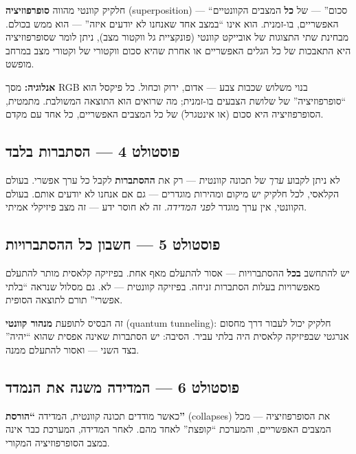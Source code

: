 \documentclass[
  hebrew,
  letterpaper,
  DIV=11,
  numbers=noendperiod]{scrreprt}
\begin{document}
חלקיק קוונטי מהווה \textbf{סופרפוזיציה} (superposition) --- ``סכום'' ---
של \textbf{כל} המצבים הקוונטיים האפשריים, בו-זמנית. הוא אינו ``במצב אחד
שאנחנו לא יודעים איזה'' --- הוא ממש בכולם. מבחינת שתי התצוגות של אובייקט
קוונטי (פונקציית גל ווקטור מצב), ניתן לומר שסופרפוזיציה היא התאבכות של
כל הגלים האפשריים או אחרת שהיא סכום ווקטורי של וקטורי מצב במרחב מופשט.

\textbf{אנלוגיה:} מסך RGB בנוי משלוש שכבות צבע --- אדום, ירוק וכחול. כל
פיקסל הוא ``סופרפוזיציה'' של שלושת הצבעים בו-זמנית; מה שרואים הוא התוצאה
המשולבת. מתמטית, הסופרפוזיציה היא סכום (או אינטגרל) של כל המצבים
האפשריים, כל אחד עם מקדם.

\subsection{פוסטולט 4 --- הסתברות
בלבד}\label{ux5e4ux5d5ux5e1ux5d8ux5d5ux5dcux5d8-4-ux5d4ux5e1ux5eaux5d1ux5e8ux5d5ux5ea-ux5d1ux5dcux5d1ux5d3}

לא ניתן לקבוע \emph{ערך} של תכונה קוונטית --- רק את \textbf{ההסתברות}
לקבל כל ערך אפשרי. בעולם הקלאסי, לכל חלקיק יש מיקום ומהירות מוגדרים ---
גם אם אנחנו לא יודעים אותם. בעולם הקוונטי, אין ערך מוגדר \emph{לפני
המדידה}. זה לא חוסר ידע --- זה מצב פיזיקלי אמיתי.

\subsection{פוסטולט 5 --- חשבון כל
ההסתברויות}\label{ux5e4ux5d5ux5e1ux5d8ux5d5ux5dcux5d8-5-ux5d7ux5e9ux5d1ux5d5ux5df-ux5dbux5dc-ux5d4ux5d4ux5e1ux5eaux5d1ux5e8ux5d5ux5d9ux5d5ux5ea}

יש להתחשב \textbf{בכל} ההסתברויות --- אסור להתעלם מאף אחת. בפיזיקה
קלאסית מותר להתעלם מאפשרויות בעלות הסתברות זניחה. בפיזיקה קוונטית ---
לא. גם מסלול שנראה ``בלתי אפשרי'' תורם לתוצאה הסופית.

זה הבסיס לתופעת \textbf{מנהור קוונטי} (quantum tunneling): חלקיק יכול
לעבור דרך מחסום אנרגטי שבפיזיקה קלאסית היה בלתי עביר. הסיבה: יש הסתברות
שאינה אפסית שהוא ``יהיה'' בצד השני --- ואסור להתעלם ממנה.

\subsection{פוסטולט 6 --- המדידה משנה את
הנמדד}\label{ux5e4ux5d5ux5e1ux5d8ux5d5ux5dcux5d8-6-ux5d4ux5deux5d3ux5d9ux5d3ux5d4-ux5deux5e9ux5e0ux5d4-ux5d0ux5ea-ux5d4ux5e0ux5deux5d3ux5d3}

כאשר מודדים תכונה קוונטית, המדידה \textbf{``הורסת''} (collapses) את
הסופרפוזיציה --- מכל המצבים האפשריים, והמערכת ``קופצת'' לאחד מהם. לאחר
המדידה, המערכת כבר אינה במצב הסופרפוזיציה המקורי.
\end{document}
